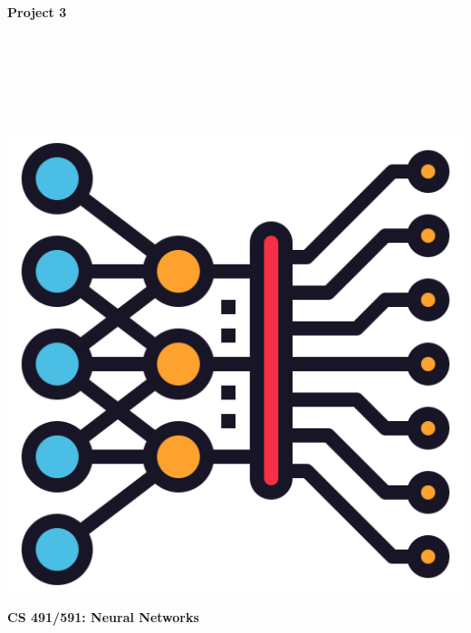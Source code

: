 \documentclass{article}
\begin{document}
\begin{titlepage}
\begin{center}
\vspace*{1cm}
            
\Huge
\textbf{Project 3}
            
\vspace{1cm}

\Large
{}

\vspace{2cm}

 \\
 \\
 \\
 \\
 \\

\vspace{2cm}

\includegraphics[scale=0.25]{figs/icon.png}\\[0.5cm]

\vspace{9cm}

\textbf{CS 491/591: Neural Networks} \\

\end{center}
\end{titlepage}
\end{document}
